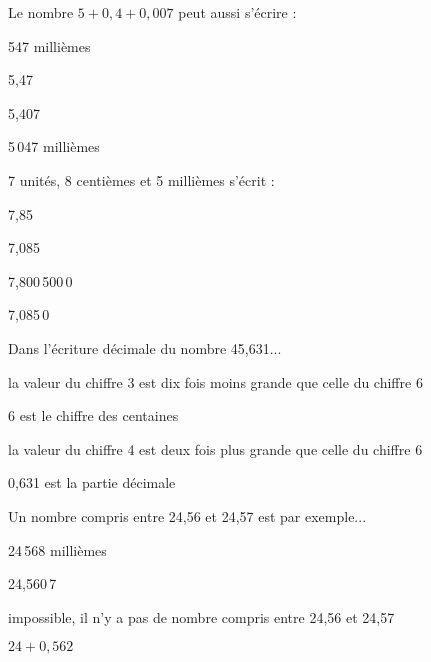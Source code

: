 \begin{QCM}
\begin{GroupeQCM}
    \begin{exercice}
      Le nombre $5 + 0,4 + 0,007$ peut aussi s'écrire :
      \begin{ChoixQCM}{4}
      \item 547 millièmes
      \item 5,47
      \item 5,407
      \item 5\,047 millièmes
      \end{ChoixQCM}
      \begin{corrige}
   \end{corrige}
    \end{exercice}
    
     \begin{exercice}
      7 unités, 8 centièmes et 5 millièmes s'écrit :
      \begin{ChoixQCM}{4}
      \item 7,85
      \item 7,085
      \item 7,800\,500\,0
      \item 7,085\,0
      \end{ChoixQCM}
      \begin{corrige}
   \end{corrige}
    \end{exercice}

     \begin{exercice}
      Dans l'écriture décimale du nombre 45,631...
      \begin{ChoixQCM}{4}
      \item la valeur du chiffre 3 est dix fois moins grande que celle du chiffre 6
      \item 6 est le chiffre des centaines
      \item la valeur du chiffre 4 est deux fois plus grande que celle du chiffre 6
      \item 0,631 est la partie décimale
      \end{ChoixQCM}
      \begin{corrige}
   \end{corrige}
    \end{exercice}

     \begin{exercice}
      Un nombre compris entre 24,56 et 24,57 est par exemple...
      \begin{ChoixQCM}{4}
      \item 24\,568 millièmes
      \item 24,560\,7
      \item impossible, il n'y a pas de nombre compris entre 24,56 et 24,57
      \item $24 + 0,562$
      \end{ChoixQCM}
      \begin{corrige}
   \end{corrige}
    \end{exercice}
    

\end{GroupeQCM}
\end{QCM}
